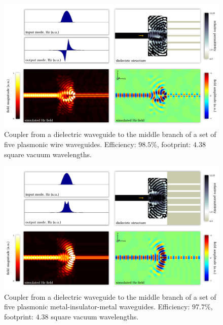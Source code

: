 \begin{figure}[h!]
    \centering
    \includegraphics[width=\textwidth]{p3/18}
    \caption{
        Coupler from a dielectric waveguide to the 
            middle branch of a set of five plasmonic wire waveguides.
        Efficiency: $98.5\%$,
        footprint: $4.38$ square vacuum wavelengths.
        }
\end{figure}
\begin{figure}[h!]
    \centering
    \includegraphics[width=\textwidth]{p3/19}
    \caption{
        Coupler from a dielectric waveguide to the 
            middle branch of a set of five plasmonic 
            metal-insulator-metal waveguides.
        Efficiency: $97.7\%$,
        footprint: $4.38$ square vacuum wavelengths.
        }
\end{figure}
